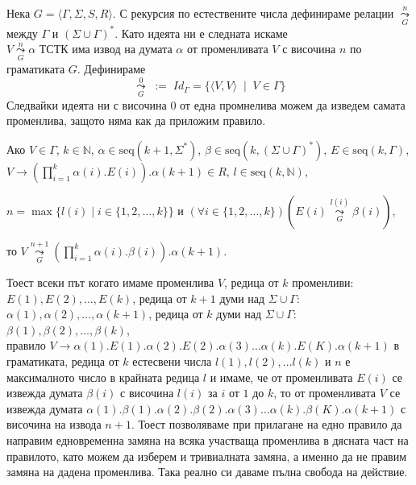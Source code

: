 \documentclass[12pt]{article}
\begin{document}
\vspace*{5mm}
\par Нека \(G = \langle \Gamma,  \Sigma, S, R\rangle\). 
С рекурсия по естествените числа дефинираме релации \(\underset{G}{\overset{n}{\leadsto}}\)  между \(\Gamma\) и \((\Sigma \cup \Gamma)^*\).
Като идеята ни е следната искаме \\
\(V \underset{G}{\overset{n}{\leadsto}} \alpha\) ТСТК има извод на думата \(\alpha\) от променливата \(V\) с височина \(n\) по граматиката \(G\).
Дефинираме
\[\underset{G}{\overset{0}{\leadsto}} \;:=\; Id_\Gamma = \{\langle V, V \rangle \;\mid\; V \in \Gamma\}\]
Следвайки идеята ни с височина \(0\) от една промнелива можем да изведем самата променлива, защото няма как да приложим правило.
\vspace*{5mm}
\par Ако \(V \in \Gamma\), \(k \in \mathbb{N}\), \(\alpha \in \mathrm{seq}(k + 1, \Sigma^*)\), \(\beta \in \mathrm{seq}(k, (\Sigma \cup \Gamma)^*)\), \(E \in \mathrm{seq}(k, \Gamma)\), \(V \to \left(\displaystyle\prod_{i = 1}^k \alpha(i).E(i) \right).\alpha(k + 1) \in R\), \(l \in \mathrm{seq}(k, \mathbb{N})\),

\(n = \max\{ l(i) \mid i \in \{1, 2, \dots, k\} \}\) и \((\forall i \in \{1, 2, \dots, k\})(E(i) \underset{G}{\overset{l(i)}{\leadsto}} \beta(i) )\),

то \(V \underset{G}{\overset{n + 1}{\leadsto}} \left( \displaystyle\prod_{i = 1}^k \alpha(i).\beta(i) \right ).\alpha(k + 1)\).

\vspace*{5mm}
\par Тоест всеки път когато имаме променлива \(V\), редица от \(k\) променливи: \(E(1), E(2), \dots, E(k)\),
редица от \(k + 1\) думи над \(\Sigma \cup \Gamma\): \(\alpha(1), \alpha(2), \dots, \alpha(k + 1)\),
редица от \(k\) думи над \(\Sigma \cup \Gamma\): \(\beta(1), \beta(2), \dots, \beta(k)\), \\
правило \(V \to \alpha(1).E(1).\alpha(2).E(2).\alpha(3) \dots \alpha(k).E(K).\alpha(k + 1)\) в граматиката,
редица от \(k\) естесвени числа \(l(1), l(2), \dots l(k)\) и \(n\) е максималното число в крайната редица \(l\)
и имаме, че от променливата \(E(i)\) се извежда думата \(\beta(i)\) с височина \(l(i)\) за \(i\) от \(1\) до \(k\),
то от променливата \(V\) се извежда думата \(\alpha(1).\beta(1).\alpha(2).\beta(2).\alpha(3) \dots \alpha(k).\beta(K).\alpha(k + 1)\) с височина на извода \(n + 1\).
Тоест позволяваме при прилагане на едно правило да направим едновременна замяна на всяка участваща променлива в дясната част на правилото, като можем да изберем и тривиалната замяна, а именно да не правим замяна на дадена променлива. Така реално си даваме пълна свобода на действие.
\end{document}
